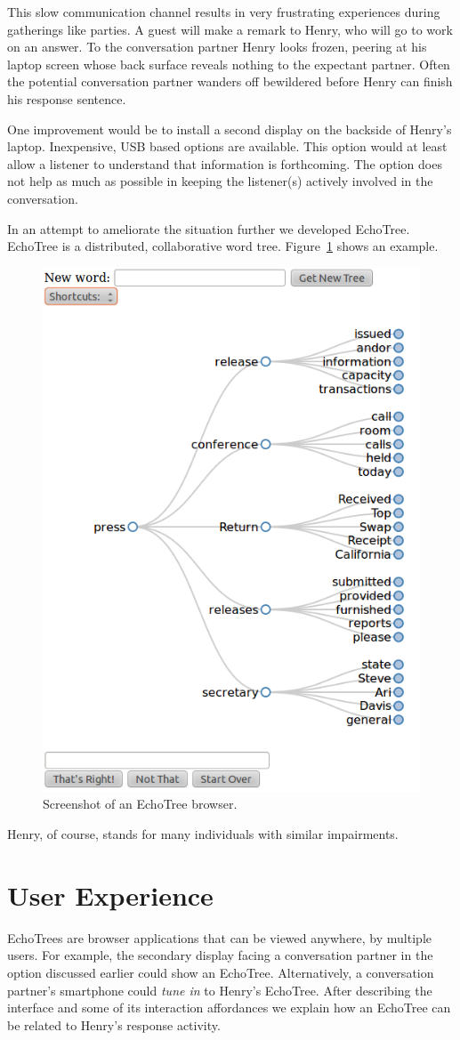 \documentclass{sigchi}
\begin{document}
This slow communication channel results in very frustrating
experiences during gatherings like parties. A guest will make a remark
to Henry, who will go to work on an answer. To the conversation
partner Henry looks frozen, peering at his laptop screen whose back
surface reveals nothing to the expectant partner. Often the potential
conversation partner wanders off bewildered before Henry can finish
his response sentence.

One improvement would be to install a second display on the backside
of Henry's laptop. Inexpensive, USB based options are available. This
option would at least allow a listener to understand that information
is forthcoming. The option does not help as much as possible in
keeping the listener(s) actively involved in the conversation. 

In an attempt to ameliorate the situation further we developed
EchoTree. EchoTree is a distributed, collaborative word
tree. Figure~\ref{fig:echoTree} shows an example.
\begin{figure}
   \centering
   \includegraphics[width=0.6\columnwidth]{Figs/echoTreeScreenshot.png}
   \caption{Screenshot of an EchoTree browser.}
   \label{fig:echoTree}
\end{figure}
Henry, of course, stands for many individuals with similar
impairments. 
\section{User Experience}
EchoTrees are browser applications that can be viewed anywhere, by
multiple users. For example, the secondary display facing a
conversation partner in the option discussed earlier could show an
EchoTree. Alternatively, a conversation partner's smartphone could
{\em tune in} to Henry's EchoTree. After describing the interface and
some of its interaction affordances we explain how an EchoTree can be
related to Henry's response activity.
\end{document}
